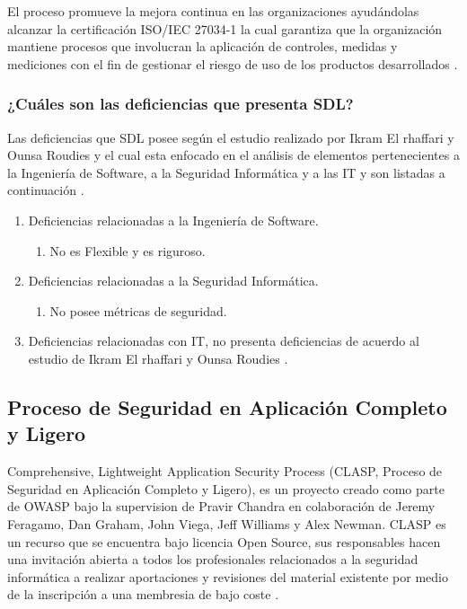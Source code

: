 \documentclass[runningheads,a4paper]{llncs}
\begin{document}
El proceso promueve la mejora continua en las organizaciones ayudándolas alcanzar la certificación ISO/IEC 27034-1 la cual garantiza que la organización mantiene procesos que involucran la aplicación de controles, medidas y mediciones con el fin de gestionar el riesgo de uso de los productos desarrollados \cite{SDLWhitePaper}. 

\subsubsection{¿Cuáles son las deficiencias que presenta \gls{SDL}?}
Las deficiencias que \gls{SDL} posee según el estudio realizado por Ikram El rhaffari y Ounsa Roudies y el cual esta enfocado en el análisis de elementos pertenecientes a la Ingeniería de \gls{Software}, a la Seguridad Informática y a las \gls{IT} y son listadas a continuación \cite{BenchmarkingSDLCLAPS}. 

\begin{enumerate}
	\item Deficiencias relacionadas a la Ingeniería de \gls{Software}.
		\begin{enumerate}
			\item No es \gls{Flexible} y es riguroso.\\
			
		\end{enumerate}
	\item Deficiencias relacionadas a la Seguridad Informática.
		\begin{enumerate}
			\item No posee métricas de seguridad.\\
			
		\end{enumerate}
	\item Deficiencias relacionadas con \gls{IT}, no presenta deficiencias de acuerdo al estudio de Ikram El rhaffari y Ounsa Roudies \cite{BenchmarkingSDLCLAPS}.
		
\end{enumerate}

\subsection{Proceso de Seguridad en Aplicación Completo y Ligero}
Comprehensive, Lightweight Application Security Process (CLASP, Proceso de Seguridad en Aplicación Completo y Ligero), es un proyecto creado como parte de \gls{OWASP} bajo la supervision de Pravir Chandra en colaboración de Jeremy Feragamo, Dan Graham, John Viega, Jeff Williams y Alex Newman. \gls{CLASP} es un recurso que se encuentra bajo licencia \gls{Open Source}, sus responsables hacen una invitación abierta a todos los profesionales relacionados a la seguridad informática a realizar aportaciones y revisiones del material existente por medio de la inscripción a una membresia de bajo coste \cite{CLASPIntroduction}.
\end{document}
